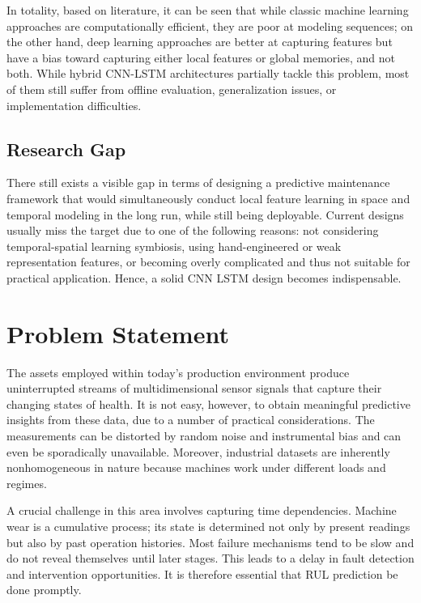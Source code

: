 \documentclass[conference]{IEEEtran}
\begin{document}
In totality, based on literature, it can be seen that while classic machine learning approaches are computationally efficient, they are poor at modeling sequences; on the other hand, deep learning approaches are better at capturing features but have a bias toward capturing either local features or global memories, and not both. While hybrid CNN-LSTM architectures partially tackle this problem, most of them still suffer from offline evaluation, generalization issues, or implementation difficulties.

\subsection{Research Gap}
There still exists a visible gap in terms of designing a predictive maintenance framework that would simultaneously conduct local feature learning in space and temporal modeling in the long run, while still being deployable. Current designs usually miss the target due to one of the following reasons: not considering temporal-spatial learning symbiosis, using hand-engineered or weak representation features, or becoming overly complicated and thus not suitable for practical application. Hence, a solid CNN LSTM design becomes indispensable.

\section{Problem Statement}

The assets employed within today’s production environment produce uninterrupted streams of multidimensional sensor signals that capture their changing states of health. It is not easy, however, to obtain meaningful predictive insights from these data, due to a number of practical considerations. The measurements can be distorted by random noise and instrumental bias and can even be sporadically unavailable. Moreover, industrial datasets are inherently nonhomogeneous in nature because machines work under different loads and regimes.

A crucial challenge in this area involves capturing time dependencies. Machine wear is a cumulative process; its state is determined not only by present readings but also by past operation histories. Most failure mechanisms tend to be slow and do not reveal themselves until later stages. This leads to a delay in fault detection and intervention opportunities. It is therefore essential that RUL prediction be done promptly.
\end{document}
